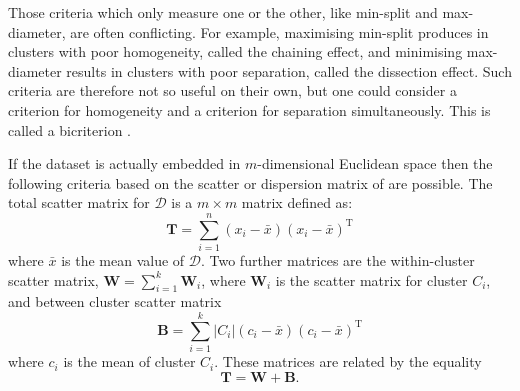 \documentclass[a4paper]{report}
\newcommand{\dset}{\mathcal{D}}
\begin{document}
Those criteria which only measure one or the other, like min-split and
max-diameter, are often conflicting.  For example, maximising min-split
produces in clusters with poor homogeneity, called the chaining effect, and
minimising max-diameter results in clusters with poor separation, called the
dissection effect.  Such criteria are therefore not so useful on their own,
but one could consider a criterion for homogeneity and a criterion for
separation simultaneously.  This is called a bicriterion
\citep{delattre1980bicriterion}.

If the dataset is actually embedded in $m$-dimensional Euclidean space then
the following criteria based on the scatter or dispersion matrix of
\citet{wilks60} are possible.  The total scatter matrix for $\dset$ is a $m
\times m$ matrix defined
as:
\begin{equation*}
  \mathbf{T} = \sum_{i=1}^{n} (x_i - \bar{x})(x_i - \bar{x})^{\mathrm{T}}
\end{equation*}
where $\bar{x}$ is the mean value of $\dset$.  Two further matrices are
the within-cluster scatter matrix, $\mathbf{W} = \sum_{i=1}^{k} \mathbf{W}_i$,
where $\mathbf{W}_i$ is the scatter matrix for cluster $C_i$, and between
cluster scatter matrix
\begin{equation*}
  \mathbf{B} =
  \sum_{i=1}^{k} |C_i| (c_i - \bar{x}) (c_i - \bar{x})^{\mathrm{T}}
\end{equation*}
where $c_i$ is the mean of cluster $C_i$.  These matrices are related by the
equality
\begin{equation*}
  \mathbf{T} = \mathbf{W} + \mathbf{B}.
\end{equation*}
\end{document}
